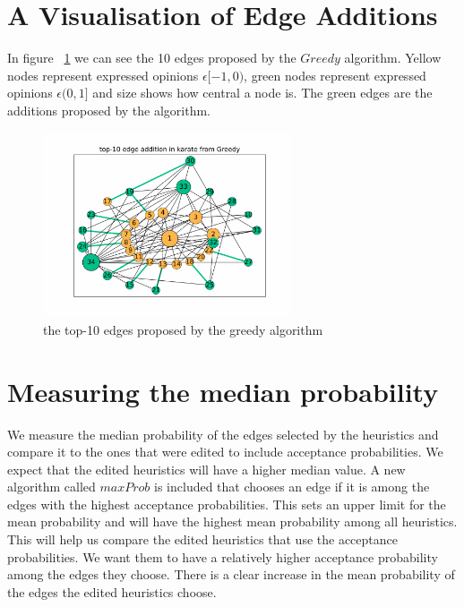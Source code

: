  \section{A Visualisation of Edge Additions}
\label{sec:vis}
In figure ~\ref{fig:top-10-karate} we can see the 10 edges proposed by the $Greedy$ algorithm. Yellow nodes represent expressed opinions $\epsilon [-1,0)$, green nodes represent expressed opinions $\epsilon (0,1]$ and size shows how central a node is. The green edges are the additions proposed by the algorithm.
\\

\begin{figure}[!htbp]
	\centering
	\captionsetup{justification=centering,margin=2cm}
	\includegraphics[width=0.65\textwidth]{Figures/top-10_karate_greedy}
	\caption{the top-10 edges proposed by the greedy algorithm}
	\label{fig:top-10-karate}
\end{figure}
\clearpage

\section{Measuring the median probability}		
\label{sec:median}

We measure the median probability of the edges selected by the heuristics and compare it to the ones that were edited to include acceptance probabilities. We expect that the edited heuristics will have a higher median value. A new algorithm called $maxProb$ is included that chooses an edge if it is among the edges with the highest acceptance probabilities. This sets an upper limit for the mean probability and will have the highest mean probability among all heuristics. This will help us compare the edited heuristics that use the acceptance probabilities. We want them to have a relatively higher acceptance probability among the edges they choose. There is a clear increase in the mean probability of the edges the edited heuristics choose.

